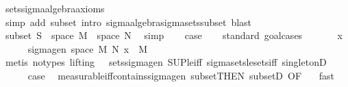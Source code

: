 \begin{isabellebody}
\ sets{\isachardot}{\kern0pt}sigma{\isacharunderscore}{\kern0pt}algebra{\isacharunderscore}{\kern0pt}axioms\ \isamarkupfalse%
\ {\isacharparenleft}{\kern0pt}simp\ add{\isacharcolon}{\kern0pt}\ subset{\isacharcomma}{\kern0pt}\ intro\ sigma{\isacharunderscore}{\kern0pt}algebra{\isachardot}{\kern0pt}sigma{\isacharunderscore}{\kern0pt}sets{\isacharunderscore}{\kern0pt}subset{\isacharcomma}{\kern0pt}\ blast{\isacharplus}{\kern0pt}{\isacharparenright}{\kern0pt}\isanewline
{}\isamarkupfalse%
\isanewline
\ \ \isamarkupfalse%
\ {}\isanewline
\ \ \isamarkupfalse%
\ subset{\isacharcolon}{\kern0pt}\ {\isachardoublequoteopen}S\ {\isasymsubseteq}\ space\ M\ {\isasymrightarrow}\ space\ N{\isachardoublequoteclose}\ \isamarkupfalse%
\ simp\isanewline
\ \ \isamarkupfalse%
\ {\isacharquery}{\kern0pt}case\isanewline
\ \ \isamarkupfalse%
\ {\isacharparenleft}{\kern0pt}standard{\isacharcomma}{\kern0pt}\ goal{\isacharunderscore}{\kern0pt}cases{\isacharparenright}{\kern0pt}\isanewline
\ \ \ \ \isamarkupfalse%
\ {\isacharparenleft}{\kern0pt}{}\ x{\isacharparenright}{\kern0pt}\isanewline
\ \ \ \ \isamarkupfalse%
\ {\isachardoublequoteopen}sigma{\isacharunderscore}{\kern0pt}gen\ {\isacharparenleft}{\kern0pt}space\ M{\isacharparenright}{\kern0pt}\ N\ {\isacharbraceleft}{\kern0pt}x{\isacharbraceright}{\kern0pt}\ {\isasymsubseteq}\ M{\isachardoublequoteclose}\ \isamarkupfalse%
\ {\isacharparenleft}{\kern0pt}metis\ {\isacharparenleft}{\kern0pt}no{\isacharunderscore}{\kern0pt}types{\isacharcomma}{\kern0pt}\ lifting{\isacharparenright}{\kern0pt}\ {}\ {}\ sets{\isacharunderscore}{\kern0pt}sigma{\isacharunderscore}{\kern0pt}gen\ SUP{\isacharunderscore}{\kern0pt}le{\isacharunderscore}{\kern0pt}iff\ sigma{\isacharunderscore}{\kern0pt}sets{\isacharunderscore}{\kern0pt}le{\isacharunderscore}{\kern0pt}sets{\isacharunderscore}{\kern0pt}iff\ singletonD{\isacharparenright}{\kern0pt}\isanewline
\ \ \ \ \isamarkupfalse%
\ {\isacharquery}{\kern0pt}case\ \isamarkupfalse%
\ measurable{\isacharunderscore}{\kern0pt}iff{\isacharunderscore}{\kern0pt}contains{\isacharunderscore}{\kern0pt}sigma{\isacharunderscore}{\kern0pt}gen\ subset{\isacharbrackleft}{\kern0pt}THEN\ subsetD{\isacharcomma}{\kern0pt}\ OF\ {}{\isacharbrackright}{\kern0pt}\ \isamarkupfalse%
\ fast\ \isanewline
\ \ \isamarkupfalse%
\isanewline
{}\isamarkupfalse%
%
\endisatagproof
{\isafoldproof}%
%
\isadelimproof
\isanewline
%
\endisadelimproof
%
\isadelimtheory
\isanewline
%
\endisadelimtheory
%
\isatagtheory
{}\isamarkupfalse%
%
\endisatagtheory
{\isafoldtheory}%
%
\isadelimtheory
%
\endisadelimtheory
%
\end{isabellebody}%
